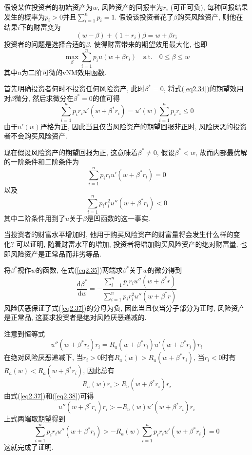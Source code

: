 \documentclass[cn, 12pt, math=mtpro2, bibstyle=apa, blue]{elegantbook}
\begin{document}
\begin{example}
假设某位投资者的初始资产为$w$, 风险资产的回报率为$r_i$ (可正可负), 每种回报结果发生的概率为$p_i>0$并且$\sum_{i=1}^{n}p_i=1$. 假设该投资者花了$\beta$购买风险资产, 则他在结果$i$下的财富变为
$$(w-\beta)+(1+r_i)\beta=w+\beta r_i$$
投资者的问题是选择合适的$\beta$, 使得财富带来的期望效用最大化, 也即
\begin{equation}\label{eq2.34}
  \max_\beta \sum_{i=1}^{n}p_iu(w+\beta r_i)\quad \text{s.t.}\quad 0\leq \beta\leq w
\end{equation}
其中$u$为二阶可微的vNM效用函数. 

首先明确投资者何时不投资任何风险资产, 此时$\beta^\ast=0$, 将式(\ref{eq2.34})的期望效用对$\beta$微分, 然后求微分在$\beta^\ast=0$的值可得
$$\sum_{i=1}^{n}p_ir_iu'(w+\beta^\ast r_i)=u'(w)\sum_{i=1}^{n}p_ir_i\leq 0$$
由于$u'(w)$严格为正, 因此当且仅当风险资产的期望回报非正时, 风险厌恶的投资者不会购买风险资产. 

现在假设风险资产的期望回报为正, 这意味着$\beta^\ast\neq 0$, 假设$\beta^\ast<w$, 故而内部最优解的一阶条件和二阶条件为
\begin{equation}\label{eq2.35}
  \sum_{i=1}^{n}p_ir_iu'(w+\beta^\ast r_i)=0
\end{equation}
以及
\begin{equation}\label{eq2.36}
\sum_{i=1}^{n}p_ir_i^2u''(w+\beta^\ast r_i)<0
\end{equation}
其中二阶条件用到了$u$关于$\beta$是凹函数的这一事实.

当投资者的财富水平增加时, 他用于购买风险资产的财富量将会发生什么样的变化? 可以证明, 随着财富水平的增加, 投资者将增加购买风险资产的绝对财富量, 也即风险资产是正常品而非劣等品.

将$\beta^\ast$视作$w$的函数, 在式(\ref{eq2.35})两端求$\beta^\ast$关于$w$的微分得到
\begin{equation}\label{eq2.37}
  \frac{\text{d}\beta^\ast}{\text{d}w}=-\frac{\sum_{i=1}^{n}p_ir_iu''(w+\beta^\ast r)}{\sum_{i=1}^{n}p_ir_i^2u''(w+\beta^\ast r)}
\end{equation}
风险厌恶保证了式(\ref{eq2.37})的分母为负, 因此当且仅当分子部分为正时, 风险资产是正常品, 这要求投资者是绝对风险厌恶递减的.

注意到恒等式
$$u''(w+\beta^\ast r_i)r_i=R_a(w+\beta^\ast r_i)u'(w+\beta^\ast r_i)r_i$$
在绝对风险厌恶递减下, 当$r_i>0$时有$R_a(w)>R_a(w+\beta^\ast r_i)$, 当$r_i<0$时有$R_a(w)<R_a(w+\beta^\ast r_i)$, 因此总有
\begin{equation}\label{eq2.38}
  R_a(w)r_i>R_a(w+\beta^\ast r_i)r_i
\end{equation}
由式(\ref{eq2.37})和(\ref{eq2.38})可得
$$u''(w+\beta^\ast r_i)r_i>-R_a(w)u'(w+\beta^\ast r_i)r_i$$
上式两端取期望得到
$$\sum_{i=1}^{n}p_ir_iu''(w+\beta^\ast r_i)>-R_a(w)\sum_{i=1}^{n}p_ir_iu'(w+\beta^\ast r_i)=0$$
这就完成了证明.

\end{example}
\end{document}

